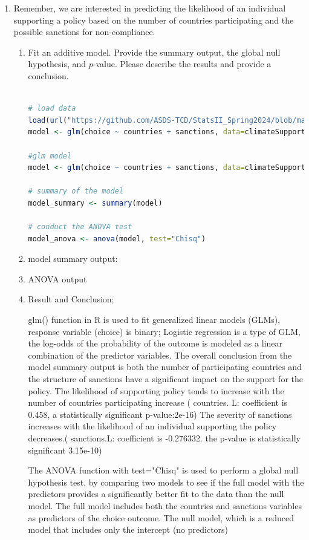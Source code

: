 \documentclass[12pt,letterpaper]{article}
\begin{document}
\begin{enumerate}
	\item
	Remember, we are interested in predicting the likelihood of an individual supporting a policy based on the number of countries participating and the possible sanctions for non-compliance.
	\begin{enumerate}
		\item [] Fit an additive model. Provide the summary output, the global null hypothesis, and $p$-value. Please describe the results and provide a conclusion.
      \begin{lstlisting}[language=R] 

# load data
load(url("https://github.com/ASDS-TCD/StatsII_Spring2024/blob/main/datasets/climateSupport.RData?raw=true"))
model <- glm(choice ~ countries + sanctions, data=climateSupport, family=binomial(link="logit"))

#glm model
model <- glm(choice ~ countries + sanctions, data=climateSupport, family=binomial(link="logit"))

# summary of the model
model_summary <- summary(model)

# conduct the ANOVA test
model_anova <- anova(model, test="Chisq")
\end{lstlisting} 
\item model summary output:

\vspace{2cm}
\item ANOVA output 

\vspace{1cm}
\item Result and Conclusion;


glm() function in R is used to fit generalized linear models (GLMs), response variable (choice) is binary; Logistic regression is a type of GLM, the log-odds of the probability of the outcome is modeled as a linear combination of the predictor variables.  The overall conclusion from the model summary output is both the number of participating countries and the structure of sanctions have a significant impact on the support for the policy. The likelihood of supporting policy tends to increase with the number of countries participating increase ( countries. L: coefficient is 0.458, a statistically significant p-value:2e-16) The severity of sanctions increases with the likelihood of an individual supporting the policy decreases.( sanctions.L:  coefficient is -0.276332. the p-value is  statistically significant 3.15e-10)

The ANOVA function with test="Chisq" is used to perform a global null hypothesis test, by comparing two models to see if the full model with the predictors provides a significantly better fit to the data than the null model. The full model includes both the countries and sanctions variables as predictors of the choice outcome. The null model, which is a reduced model that includes only the intercept (no predictors)



\end{enumerate}
\end{enumerate}
\end{document}
